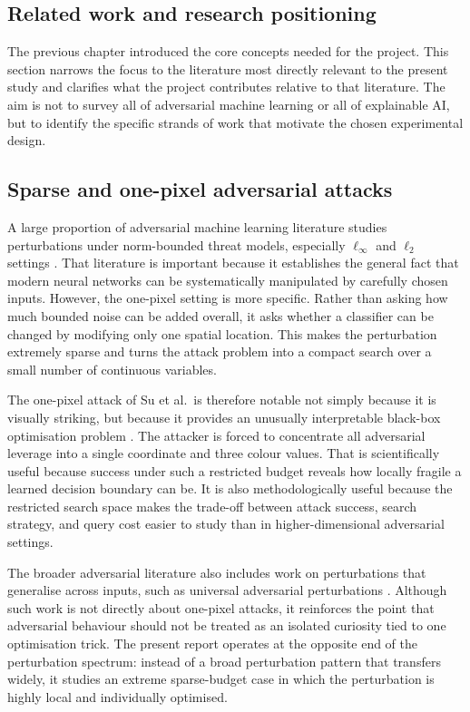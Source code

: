 \subsection{Related work and research positioning}
\label{sec:related_work}

The previous chapter introduced the core concepts needed for the project.
This section narrows the focus to the literature most directly relevant to the present study and clarifies what the project contributes relative to that literature.
The aim is not to survey all of adversarial machine learning or all of explainable AI, but to identify the specific strands of work that motivate the chosen experimental design.

\subsection{Sparse and one-pixel adversarial attacks}
A large proportion of adversarial machine learning literature studies perturbations under norm-bounded threat models, especially $\ell_\infty$ and $\ell_2$ settings \cite{goodfellow2015explaining,madry2018towards}.
That literature is important because it establishes the general fact that modern neural networks can be systematically manipulated by carefully chosen inputs.
However, the one-pixel setting is more specific.
Rather than asking how much bounded noise can be added overall, it asks whether a classifier can be changed by modifying only one spatial location.
This makes the perturbation extremely sparse and turns the attack problem into a compact search over a small number of continuous variables.

The one-pixel attack of Su et al.\ is therefore notable not simply because it is visually striking, but because it provides an unusually interpretable black-box optimisation problem \cite{su2019onepixel}.
The attacker is forced to concentrate all adversarial leverage into a single coordinate and three colour values.
That is scientifically useful because success under such a restricted budget reveals how locally fragile a learned decision boundary can be.
It is also methodologically useful because the restricted search space makes the trade-off between attack success, search strategy, and query cost easier to study than in higher-dimensional adversarial settings.

The broader adversarial literature also includes work on perturbations that generalise across inputs, such as universal adversarial perturbations \cite{moosavi2017universal}.
Although such work is not directly about one-pixel attacks, it reinforces the point that adversarial behaviour should not be treated as an isolated curiosity tied to one optimisation trick.
The present report operates at the opposite end of the perturbation spectrum: instead of a broad perturbation pattern that transfers widely, it studies an extreme sparse-budget case in which the perturbation is highly local and individually optimised.


